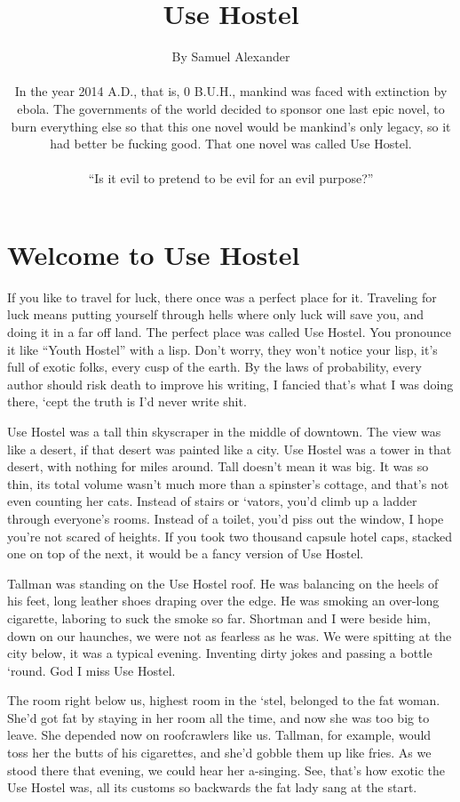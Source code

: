 \documentclass[oneside]{book}
\title{Use Hostel}
\date{}
\author{\tiny
By Samuel Alexander\\\normalfont
\small
    \parbox{0.8\linewidth}{\vspace{1in}In the year 2014 A.D.,
that is, 0 B.U.H.,
mankind was faced with extinction by ebola.
The governments of the world decided to sponsor one last epic
novel, to burn everything else so that this one novel would
be mankind's only legacy, so it had better be fucking
good.  That one novel was called Use Hostel.\\
\\
\vspace{1in}``Is it evil to pretend to be evil for an evil purpose?''}}
\begin{document}
\maketitle

\chapter{Welcome to Use Hostel}

If you like to travel for luck, there once was a perfect place for it.
Traveling for luck means putting yourself through hells
where only luck will save you, and doing it in a far
off land.  The perfect place was called Use Hostel.  You pronounce it
like ``Youth Hostel'' with a lisp.  Don't worry, they
won't notice your lisp, it's full of exotic folks, every
cusp of the earth.  By the laws of probability, every author should
risk death to improve his writing, I fancied that's what I was doing
there, `cept the truth is I'd never write shit.

Use Hostel was a tall thin skyscraper in the middle of downtown.
The view was like a desert, if that desert was painted like a city.
Use Hostel was a tower in that desert, with nothing for
miles around.  Tall doesn't mean it was
big.  It was so thin, its total volume wasn't much more
than a spinster's cottage, and that's not even counting her cats.
Instead of stairs or `vators, you'd climb up
a ladder through everyone's rooms.  Instead of a toilet, you'd piss
out the window, I hope you're not scared of heights.
If you took two thousand capsule hotel caps, stacked one on
top of the next, it would be a fancy version of Use Hostel.

Tallman was standing on the Use Hostel roof.  He was balancing on
the heels of his feet, long leather shoes draping over
the edge.  He was smoking an over-long cigarette, laboring to
suck the smoke so far.  Shortman and I were beside him, down on
our haunches, we were not as fearless as he was.  We were spitting
at the city below, it was a typical evening.  Inventing dirty
jokes and passing a bottle `round.  God I miss Use Hostel.

The room right below us, highest room in the `stel, belonged
to the fat woman.  She'd got fat by staying in her room all the time,
and now she was too big to leave.  She depended now on roofcrawlers
like us.  Tallman, for example, would toss her the butts of his
cigarettes, and she'd gobble them up like fries.
As we stood there that evening, we could hear her a-singing.
See, that's how exotic the Use Hostel was, all its customs so
backwards the fat lady sang at the start.
\end{document}
